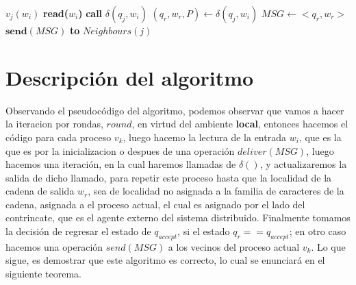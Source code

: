 \documentclass[10pt]{report}
\begin{document}
{    %
    \begin{algorithm}
        \caption{$Simula\char95Algo\char95TM(w)$}\label{alg:simula}
        \begin{algorithmic}
                  \STATE $v_{j}(w_{i})$
                  \STATE \textbf{read($w_{i}$)}
                     \STATE \textbf{call} $\delta(q_{j},w_{i})$
                     \STATE $(q_{r},w_{r},P)\gets \delta(q_{j},w_{i})$
                  \ENDWHILE
                  \ENDIF
                  \ELSE
                       \STATE $MSG\gets<q_{r},w_{r}>$
                       \STATE $\textbf{send}(MSG)$ \textbf{to} $Neighbours(j)$ 
               \ENDFOR
        \end{algorithmic}
    \end{algorithm}
    \space
    \section{Descripción del algoritmo}\label{sec:descripción-del-algoritmo}
    Observando el pseudocódigo del algoritmo, podemos observar que vamos a hacer la iteracion por rondas, $round$, en
    virtud del ambiente \textbf{local}, entonces hacemos el código para cada proceso $v_{k}$, luego hacemo la lectura de
    la entrada $w_{i}$, que es la que es por la inicializacion o despues de una operación $deliver(MSG)$, luego hacemos una
    iteración, en la cual haremos llamadas de $\delta()$, y actualizaremos la salida de dicho llamado, para repetir este
    proceso hasta que la localidad de la cadena de salida $w_{r}$, sea de localidad no asignada a la familia de caracteres
    de la cadena, asignada a el proceso actual, el cual es asignado por el lado del contrincate, que es el agente externo del sistema distribuido.
    Finalmente tomamos la decisión de regresar el estado de $q_{accept}$, si el estado $q_{r}==q_{accept}$;
    en otro caso hacemos una operación $send(MSG)$ a los vecinos del proceso actual $v_{k}$.
    \newline
    Lo que sigue, es demostrar que este algoritmo es correcto, lo cual se enunciará en el siguiente teorema.

}
\end{document}
